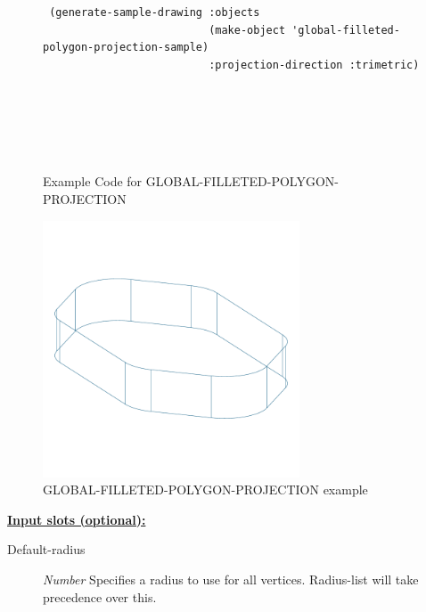 \documentclass [11pt]{book}
\begin{document}
\begin{itemize}
\begin{figure}
\begin{lrbox}{\boxedverb}
\begin{minipage}{\linewidth}
{\begin{verbatim}
 (generate-sample-drawing :objects 
                          (make-object 'global-filleted-polygon-projection-sample)
                          :projection-direction :trimetric)






\end{verbatim}}
\end{minipage}
\end{lrbox}
\fbox{\usebox{\boxedverb}}

\caption{Example Code for GLOBAL-FILLETED-POLYGON-PROJECTION}

\label{fig:example-code-GLOBAL-FILLETED-POLYGON-PROJECTION}

\end{figure}

\begin{figure}
\begin{center}
\includegraphics[width=3in,height=3in]{../images/example-GLOBAL-FILLETED-POLYGON-PROJECTION.pdf}
\end{center}

\caption{GLOBAL-FILLETED-POLYGON-PROJECTION example}

\label{fig:GLOBAL-FILLETED-POLYGON-PROJECTION}

\end{figure}





\textbf{
\underline{Input slots (optional):}}

\begin{description}

\item [Default-radius]
\emph{Number} Specifies a radius to use for all vertices. Radius-list will take precedence over this.



\end{description}
\end{itemize}
\end{document}
